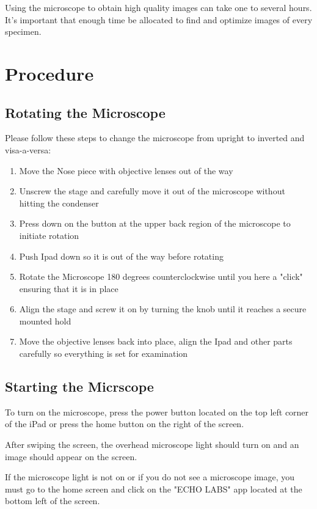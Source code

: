 \documentclass[12pt]{../SOP2}
\begin{document}
\NP Using the microscope to obtain high quality images can take one to several hours. It's important that enough time be allocated to find and optimize images of every specimen. 

\section{Procedure}

\subsection*{Rotating the Microscope}

\NP Please follow these steps to change the microscope from upright to inverted and visa-a-versa:

\begin{enumerate}
  \item Move the Nose piece with objective lenses out of the way
  \item Unscrew the stage and carefully move it out of the microscope without hitting the condenser 
  \item Press down on the button at the upper back region of the microscope to initiate rotation 
  \item Push Ipad down so it is out of the way before rotating
  \item Rotate the Microscope 180 degrees counterclockwise until you here a "click" ensuring that it is in place
  \item Align the stage and screw it on by turning the knob until it reaches a secure mounted hold
  \item Move the objective lenses back into place, align the Ipad and other parts carefully so everything is set for examination
\end{enumerate}

\subsection*{Starting the Micrscope}

\NP To turn on the microscope, press the power button located on the top left corner of the iPad or press the home button on the right of the screen.

\NP After swiping the screen, the overhead microscope light should turn on and an image should appear on the screen.
  
\NP  If the microscope light is not on or if you do not see a microscope image, you must go to the home screen and click on the "ECHO LABS" app located at the bottom left of the screen.
\end{document}
